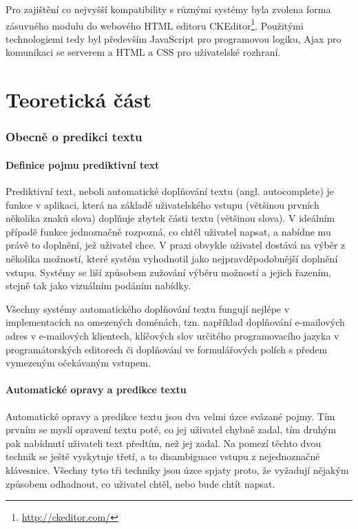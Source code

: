 \documentclass[a4paper,11pt]{article}
\begin{document}
Pro zajištění co nejvyšší kompatibility s různými systémy byla zvolena forma zásuvného modulu do webového HTML editoru CKEditor\footnote{\url{http://ckeditor.com/}}. Použitými technologiemi tedy byl především JavaScript pro programovou logiku, Ajax pro komunikaci se serverem a HTML a CSS pro uživatelské rozhraní.

\newpage

\part{Teoretická část}

\section{Obecně o predikci textu}

\subsection{Definice pojmu prediktivní text}

Prediktivní text, neboli automatické doplňování textu (angl. autocomplete) je funkce v aplikaci, která na základě uživatelského vstupu (většinou prvních několika znaků slova) doplňuje zbytek části textu (většinou slova). V ideálním případě funkce jednoznačně rozpozná, co chtěl uživatel napsat, a nabídne mu právě to doplnění, jež uživatel chce. V praxi obvykle uživatel dostává na výběr z několika možností, které systém vyhodnotil jako nejpravděpodobnější doplnění vstupu. Systémy se liší způsobem zužování výběru možností a jejich řazením, stejně tak jako vizuálním podáním nabídky.

Všechny systémy automatického doplňování textu fungují nejlépe v implementacích na omezených doménách, tzn. například doplňování e-mailových adres v e-mailových klientech, klíčových slov určitého programovacího jazyka v programátorských editorech či doplňování ve formulářových polích s předem vymezeným očekávaným vstupem. 

\subsection{Automatické opravy a predikce textu}

Automatické opravy a predikce textu jsou dva velmi úzce svázané pojmy. Tím prvním se myslí opravení textu poté, co jej uživatel chybně zadal, tím druhým pak nabídnutí uživateli text předtím, než jej zadal. Na pomezí těchto dvou technik se ještě vyskytuje třetí, a to disambiguace vstupu z nejednoznačné klávesnice. Všechny tyto tři techniky jsou úzce spjaty proto, že vyžadují nějakým způsobem odhadnout, co uživatel chtěl, nebo bude chtít napsat.
\end{document}
